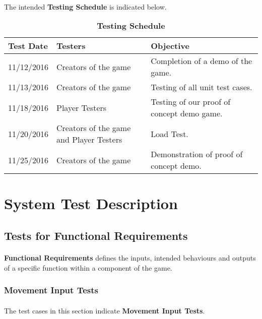 \documentclass[12pt, titlepage]{article}
\begin{document}
\paragraph{}The intended \textbf{Testing Schedule} is indicated below.
\begin{table}[ht]
\caption{\textbf{Testing Schedule}} \label{Table}
\begin{tabularx}{\textwidth}{p{3cm}p{2cm}X}
\toprule
\textbf{Test Date} & \textbf{Testers} & \textbf{Objective} \\
\midrule
11/12/2016 & Creators of the game & Completion of a demo of the game. \\
11/13/2016 & Creators of the game & Testing of all unit test cases. \\
11/18/2016 & Player Testers & Testing of our proof of concept demo game. \\
11/20/2016 & Creators of the game and Player Testers & Load Test.\\
11/25/2016 & Creators of the game & Demonstration of proof of concept demo.\\
\bottomrule
\end{tabularx}
\end{table}
\section{System Test Description}
	
\subsection{Tests for Functional Requirements}

\paragraph{}\textbf{Functional Requirements} defines the inputs, intended behaviours and outputs of a specific function within a component of the game.
\subsubsection{Movement Input Tests}
\paragraph{}The test cases in this section indicate \textbf{Movement Input Tests}.
\end{document}
